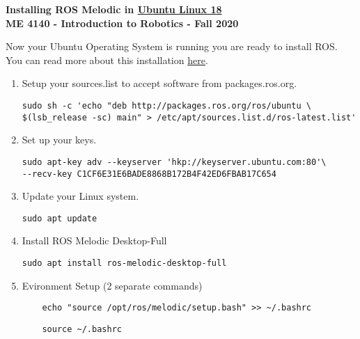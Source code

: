 \documentclass[12pt]{article}
\begin{document}
\thispagestyle{plain}

\begin{center}
	   {\bf \Large Installing ROS Melodic in {\underline{\LARGE Ubuntu Linux 18}}}\vspace{5mm} \\
   {\bf \large ME 4140 - Introduction to Robotics - Fall 2020} \vspace{2mm}\\
\end{center}



		{ Now your Ubuntu Operating System is running you are ready to install ROS. You can read more about this installation \href{http://wiki.ros.org/melodic/Installation/Ubuntu}{here}.}

\begin{enumerate}
	
	
	\item  Setup your sources.list to accept software from packages.ros.org.


	\begin{verbatim}
sudo sh -c 'echo "deb http://packages.ros.org/ros/ubuntu \
$(lsb_release -sc) main" > /etc/apt/sources.list.d/ros-latest.list'
	\end{verbatim}
	
	\item Set up your keys. 
	
	\begin{verbatim}
sudo apt-key adv --keyserver 'hkp://keyserver.ubuntu.com:80'\
--recv-key C1CF6E31E6BADE8868B172B4F42ED6FBAB17C654	
	\end{verbatim}			
	
	\item Update your Linux system. 
	
	\begin{verbatim}
sudo apt update
	\end{verbatim}	
	
	\item Install ROS Melodic Desktop-Full 
	\begin{verbatim}
sudo apt install ros-melodic-desktop-full
	\end{verbatim}
	
	\item Evironment Setup (2 separate commands) 
	\begin{verbatim} 
	echo "source /opt/ros/melodic/setup.bash" >> ~/.bashrc
	\end{verbatim}
	\begin{verbatim} 
	source ~/.bashrc 
	\end{verbatim}


\end{enumerate}
\end{document}
